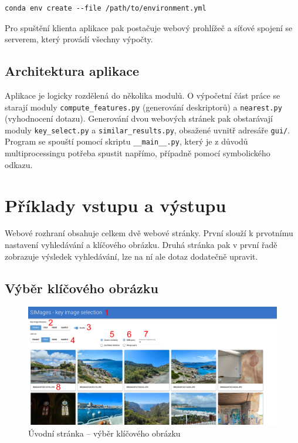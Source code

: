 \documentclass[12pt]{article}
\begin{document}
\begin{verbatim}
conda env create --file /path/to/environment.yml
\end{verbatim}

Pro spuštění klienta aplikace pak postačuje webový prohlížeč a síťové spojení se serverem, který provádí všechny výpočty.

\subsection{Architektura aplikace}

Aplikace je logicky rozdělená do několika modulů.
O výpočetní část práce se starají moduly \texttt{compute\_features.py} (generování deskriptorů) a \texttt{nearest.py} (vyhodnocení dotazu).
Generování dvou webových stránek pak obstarávají moduly \texttt{key\_select.py} a \texttt{similar\_results.py}, obsažené uvnitř adresáře \texttt{gui/}.
Program se spouští pomocí skriptu \texttt{\_\_main\_\_.py}, který je z důvodů multiprocessingu potřeba spustit napřímo, případně pomocí symbolického odkazu.

\section{Příklady vstupu a výstupu}

Webové rozhraní obsahuje celkem dvě webové stránky.
První slouží k prvotnímu nastavení vyhledávání a klíčového obrázku.
Druhá stránka pak v první řadě zobrazuje výsledek vyhledávání, lze na ní ale dotaz dodatečně upravit.

\subsection{Výběr klíčového obrázku}

\begin{figure}[h]
    \centering
    \includegraphics[width=0.9\linewidth]{key_selection_annotated.png}
    \caption{Úvodní stránka -- výběr klíčového obrázku}
    \label{fig:key-selection}
\end{figure}
\end{document}
